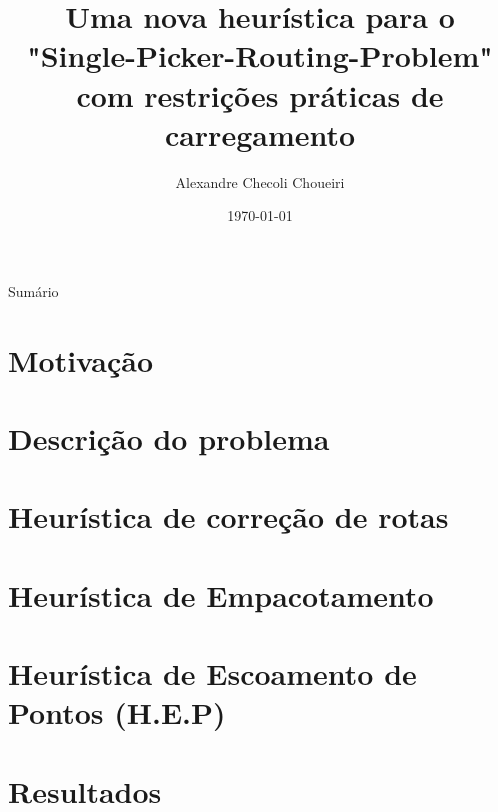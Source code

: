 \documentclass[12pt]{beamer}
\title[XXXX]{Uma nova heur\'istica para o "Single-Picker-Routing-Problem" com restri\c{c}\~oes pr\'aticas de carregamento}
\author{Alexandre Checoli Choueiri}
\institute[AI]
{UFPR  \\ %
	\medskip
	\textit{alexandrechecoli@gmail.com} %
	
}
\date{\today}
\begin{document}
	
	\begin{frame} 
		\titlepage %
	\end{frame}
	
	\begin{frame}{Sum\'ario}
		\tableofcontents
	\end{frame}
	
	
	
\section{Motiva\c{c}\~ao} %


\section{Descri\c{c}\~ao do problema} %
\section{Heur\'istica de corre\c{c}\~ao de rotas} %
\section{Heur\'istica de Empacotamento} %
\section{Heur\'istica de Escoamento de Pontos (H.E.P)} %
\section{Resultados} %
\end{document}

